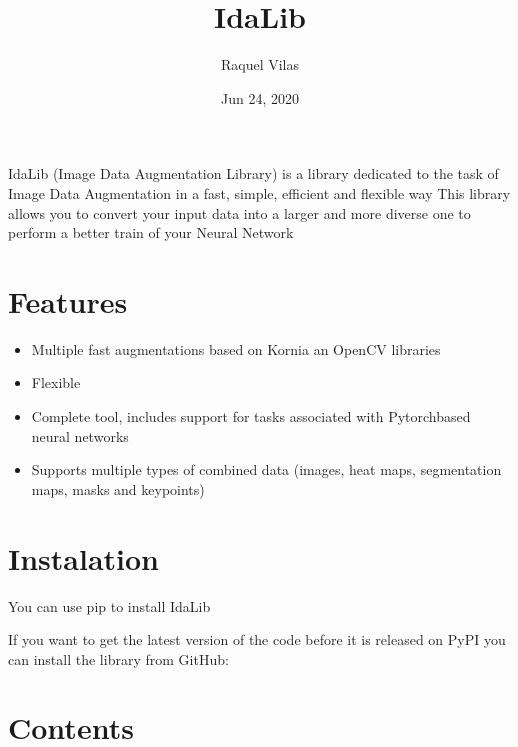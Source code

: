 \documentclass[letterpaper,10pt,english]{sphinxmanual}
\title{IdaLib}
\date{Jun 24, 2020}
\author{Raquel Vilas}
\begin{document}
\pagestyle{empty}
\sphinxmaketitle
\pagestyle{plain}
\sphinxtableofcontents
\pagestyle{normal}
\label{\detokenize{index::doc}}



IdaLib (Image Data Augmentation Library) is a library dedicated to the task of Image Data Augmentation in a fast, simple, efficient and flexible way
This library allows you to convert your input data into a larger and more diverse one to perform a better train of your Neural Network


\chapter{Features}
\label{\detokenize{index:features}}\begin{itemize}
\item {} 
Multiple fast augmentations based on Kornia an OpenCV libraries

\item {} 
Flexible

\item {} 
Complete tool, includes support for tasks associated with Pytorch\sphinxhyphen{}based neural networks

\item {} 
Supports multiple types of combined data (images, heat maps, segmentation maps, masks and keypoints)

\end{itemize}


\chapter{Instalation}
\label{\detokenize{index:instalation}}
You can use pip to install Ida\sphinxhyphen{}Lib


If you want to get the latest version of the code before it is released on PyPI you can install the library from GitHub:



\chapter{Contents}
\label{\detokenize{index:contents}}
\end{document}
